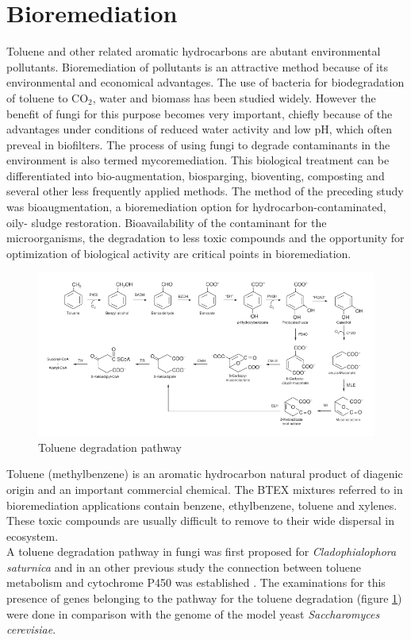 \documentclass[12pt, a4paper]{report}
\begin{document}
\section{Bioremediation}
Toluene and other related aromatic hydrocarbons are abutant environmental pollutants. Bioremediation of pollutants is an attractive method because of its
environmental and economical advantages. The use of bacteria for biodegradation of toluene to CO$_2$, water and biomass has been studied widely. However the benefit of fungi for this purpose becomes very important, chiefly because of the advantages under conditions of reduced water activity and low pH, which often preveal in biofilters. \cite{Luykx2003} The process of using fungi to degrade contaminants in the environment is also termed mycoremediation. This biological treatment can be differentiated into bio-augmentation, biosparging, bioventing, composting and several other less frequently applied methods. The method of the preceding study was bioaugmentation, a bioremediation option for hydrocarbon-contaminated, oily- sludge restoration. Bioavailability of the contaminant for the microorganisms, the degradation to less toxic compounds and the opportunity for optimization of biological activity are critical points in bioremediation. \cite{Poyntner2014} \\

\begin{figure}[H]
	\centering	
	\includegraphics[width=420pt]{pics/toldegradation.png}
	\caption[Toluene degradation pathway]
	{Toluene degradation pathway}
	\label{Toluendeg}
\end{figure}

Toluene (methylbenzene) is an aromatic hydrocarbon natural product of diagenic origin and an important commercial chemical. The BTEX mixtures referred to in bioremediation applications contain benzene, ethylbenzene, toluene and xylenes. These toxic compounds are usually difficult to remove to their wide dispersal in ecosystem. 
\\
A toluene degradation pathway in fungi was first proposed for \textit{Cladophialophora saturnica} \cite{Badali2008} and in an other previous study the connection between toluene metabolism and cytochrome P450 was established \cite{Luykx2003}. The examinations for this presence of genes belonging to the pathway for the toluene degradation (figure \ref{Toluendeg}) were done in comparison with the genome of the model yeast \textit{Saccharomyces cerevisiae}. \cite{BarbaraBlasi2015} \\
\end{document}
